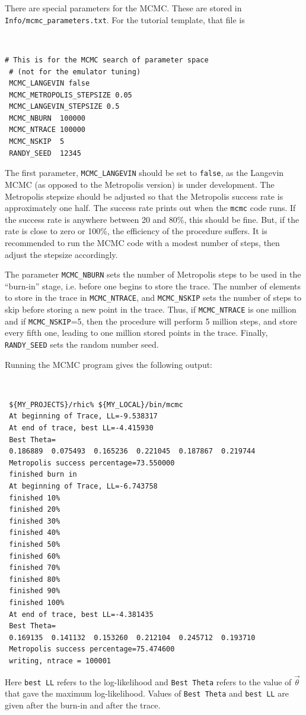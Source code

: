 \documentclass[UserManual.tex]{subfiles}
\begin{document}
There are special parameters for the MCMC. These are stored in {\tt Info/mcmc\_parameters.txt}. For the tutorial template, that file is
{\tt
\begin{verbatim}
# This is for the MCMC search of parameter space
 # (not for the emulator tuning)
 MCMC_LANGEVIN false
 MCMC_METROPOLIS_STEPSIZE 0.05
 MCMC_LANGEVIN_STEPSIZE 0.5
 MCMC_NBURN  100000
 MCMC_NTRACE 100000
 MCMC_NSKIP  5
 RANDY_SEED  12345
\end{verbatim}}
The first parameter, {\tt MCMC\_LANGEVIN} should be set to {\tt false}, as the Langevin MCMC (as opposed to the Metropolis version) is under development. The Metropolis stepsize should be adjusted so that the Metropolis success rate is approximately one half. The success rate prints out when the {\tt mcmc} code runs. If the success rate is anywhere between 20 and 80\%, this should be fine. But, if the rate is close to zero or 100\%, the efficiency of the procedure suffers. It is recommended to run the MCMC code with a modest number of steps, then adjust the stepsize accordingly.

The parameter {\tt MCMC\_NBURN} sets the number of Metropolis steps to be used in the ``burn-in'' stage, i.e. before one begins to store the trace. The number of elements to store in the trace in {\tt MCMC\_NTRACE}, and {\tt MCMC\_NSKIP} sets the number of steps to skip before storing a new point in the trace. Thus, if {\tt MCMC\_NTRACE} is one million and if {\tt MCMC\_NSKIP}=5, then the procedure will perform 5 million steps, and store every fifth one, leading to one million stored points in the trace. Finally, {\tt RANDY\_SEED} sets the random number seed. 

Running the MCMC program gives the following output:
{\tt
\begin{verbatim}
 ${MY_PROJECTS}/rhic% ${MY_LOCAL}/bin/mcmc
 At beginning of Trace, LL=-9.538317
 At end of trace, best LL=-4.415930
 Best Theta=
 0.186889  0.075493  0.165236  0.221045  0.187867  0.219744
 Metropolis success percentage=73.550000
 finished burn in
 At beginning of Trace, LL=-6.743758
 finished 10%
 finished 20%
 finished 30%
 finished 40%
 finished 50%
 finished 60%
 finished 70%
 finished 80%
 finished 90%
 finished 100%
 At end of trace, best LL=-4.381435
 Best Theta=
 0.169135  0.141132  0.153260  0.212104  0.245712  0.193710
 Metropolis success percentage=75.474600
 writing, ntrace = 100001
\end{verbatim}}
Here {\tt best LL} refers to the log-likelihood and {\tt Best Theta} refers to the value of $\vec{\theta}$ that gave the maximum log-likelihood. Values of {\tt Best Theta} and {\tt best LL} are given after the burn-in and after the trace. 
\end{document}
